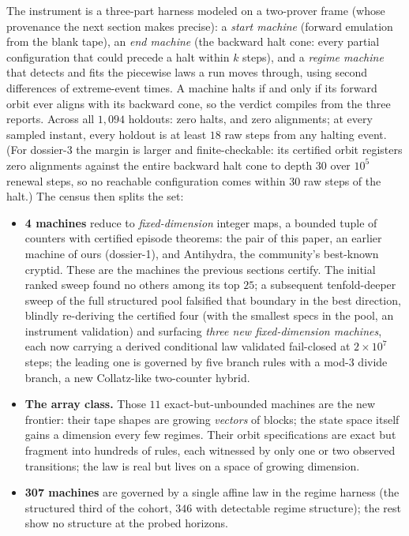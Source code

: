 \documentclass[11pt]{article}
\begin{document}
The instrument is a three-part harness modeled on a two-prover
frame (whose provenance the next section makes precise): a
\emph{start machine} (forward
emulation from the blank tape), an \emph{end machine} (the backward
halt cone: every partial configuration that could precede a halt
within $k$ steps), and a \emph{regime machine} that detects and fits
the piecewise laws a run moves through, using second differences of
extreme-event times. A machine halts if and only if its forward orbit
ever aligns with its backward cone, so the verdict compiles from the
three reports. Across all $1{,}094$ holdouts: zero halts, and zero
alignments; at every sampled instant, every holdout is at least
$18$ raw steps from any halting event. (For dossier-3 the margin is
larger and finite-checkable: its certified orbit registers zero
alignments against the entire backward halt cone to depth $30$
over $10^5$ renewal steps, so no reachable configuration comes within
$30$ raw steps of the halt.) The census then splits the set:

\begin{itemize}
\item \textbf{4 machines} reduce to
  \emph{fixed-dimension} integer maps, a bounded tuple of counters
  with certified episode theorems: the pair of this paper, an
  earlier machine of ours (dossier-1), and Antihydra, the
  community's best-known cryptid. These are the machines the previous
  sections certify. The initial ranked sweep found no others among
  its top $25$; a subsequent tenfold-deeper sweep of the full
  structured pool falsified that boundary in the best direction,
  blindly re-deriving the certified four (with the smallest specs in
  the pool, an instrument validation) and surfacing \emph{three new
  fixed-dimension machines}, each now carrying a derived conditional
  law validated fail-closed at $2 \times 10^{7}$ steps; the leading
  one is governed by five branch rules with a mod-3 divide branch, a
  new Collatz-like two-counter hybrid.
\item \textbf{The array class.} Those $11$ exact-but-unbounded
  machines are the new frontier: their tape shapes are growing
  \emph{vectors} of blocks; the state space itself gains a
  dimension every few regimes. Their orbit specifications are exact
  but fragment into hundreds of rules, each witnessed by only one
  or two observed transitions; the law
  is real but lives on a space of growing dimension.
\item \textbf{307 machines} are governed by a single affine law in
  the regime harness (the structured third of the cohort, $346$ with
  detectable regime structure); the rest show no structure at the
  probed horizons.
\end{itemize}
\end{document}
